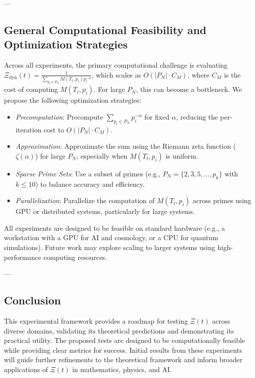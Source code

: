\documentclass{article}
\theoremstyle{plain}
\begin{document}
---

\subsection{General Computational Feasibility and Optimization Strategies}
\label{subsec:comp_feasibility}

Across all experiments, the primary computational challenge is evaluating \( \Xi_{\text{dyn}}(t) = \frac{1}{\sum_{p_i \in P_N} M(T_t, p_i) p_i^{-\alpha}} \), which scales as \( O(|P_N| \cdot C_M) \), where \( C_M \) is the cost of computing \( M(T_t, p_i) \). For large \( P_N \), this can become a bottleneck. We propose the following optimization strategies:
\begin{itemize}
    \item \textit{Precomputation}: Precompute \( \sum_{p_i \in P_N} p_i^{-\alpha} \) for fixed \( \alpha \), reducing the per-iteration cost to \( O(|P_N| \cdot C_M) \).
    \item \textit{Approximation}: Approximate the sum using the Riemann zeta function (\( \zeta(\alpha) \)) for large \( P_N \), especially when \( M(T_t, p_i) \) is uniform.
    \item \textit{Sparse Prime Sets}: Use a subset of primes (e.g., \( P_N = \{2, 3, 5, \ldots, p_k\} \) with \( k \leq 10 \)) to balance accuracy and efficiency.
    \item \textit{Parallelization}: Parallelize the computation of \( M(T_t, p_i) \) across primes using GPU or distributed systems, particularly for large systems.
\end{itemize}

All experiments are designed to be feasible on standard hardware (e.g., a workstation with a GPU for AI and cosmology, or a CPU for quantum simulations). Future work may explore scaling to larger systems using high-performance computing resources.

---

\subsection{Conclusion}

This experimental framework provides a roadmap for testing \(\Xi(t) \) across diverse domains, validating its theoretical predictions and demonstrating its practical utility. The proposed tests are designed to be computationally feasible while providing clear metrics for success. Initial results from these experiments will guide further refinements to the theoretical framework and inform broader applications of \(\Xi(t) \) in mathematics, physics, and AI.
\end{document}
